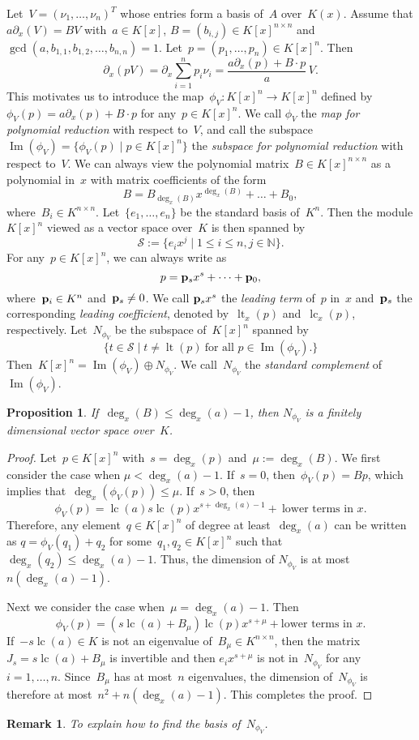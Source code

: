 \documentclass{sig-alternate}
\newtheorem{prop}[theorem]{Proposition}
\newtheorem{remark}[theorem]{Remark}
\newcommand{\red}{\color{red}}
\newcommand{\bN}{ {\mathbb N}}
\newcommand{\cS}{ {\mathcal S}}
\newcommand{\vp} {{\bf p}}
\def\lc{\operatorname{lc}}
\def\lt{\operatorname{lt}}
\def\im{\operatorname{Im}}
\begin{document}
Let~$V = (\nu_1, \ldots, \nu_n)^T$ whose entries form a basis of~$A$ over~$K(x)$. Assume that
$a \partial_x(V) = BV$ with~$a\in K[x]$, $B = (b_{i, j})\in K[x]^{n \times n}$
and $\gcd(a, b_{1, 1}, b_{1, 2}, \ldots, b_{n ,n})=1$. Let~$p = (p_1, \ldots, p_n)\in K[x]^n$. Then
\begin{equation} \label{EQ:polyred}
\partial_x (p V)=\partial_x \sum_{i=1}^n p_i \nu_i = \frac{a\partial_x(p) + B\cdot p}{a}\, V.
\end{equation}
This motivates us to introduce the map~$\phi_V: K[x]^n \rightarrow K[x]^n$
defined by~$\phi_V(p) = a \partial_x(p) + B \cdot p$ for any~$p\in K[x]^n$. We call $\phi_V$
the \emph{map for polynomial reduction} with respect to~$V$, and call
the subspace $\im(\phi_V) = \{\phi_V(p) \mid p \in K[x]^n\}$
the \emph{subspace for polynomial reduction} with respect to~$V$.
We can always view the polynomial matrix~$B\in K[x]^{n\times n}$ as a polynomial in~$x$
with matrix coefficients of the form
\[B = B_{\deg_x(B)}x^{\deg_x(B)} + \ldots + B_0, \]
where~$B_i\in K^{n\times n}$.
Let~$\{e_1, \ldots, e_n\}$ be the standard basis of~$K^n$. Then the module $K[x]^n$ viewed as a vector space over~$K$
is then spanned by
\[\cS := \{e_ix^j \mid 1\leq i \leq n, j\in \bN\}.\]
For any~$p \in K[x]^n$, we can always write as
\[p = \vp_sx^s + \cdots + \vp_0,\]
where~$\vp_i\in K^n$ and~$\vp_s \neq 0$. We call $\vp_sx^s$
the \emph{leading term} of~$p$ in~$x$ and~$\vp_s$ the corresponding \emph{leading coefficient},
denoted by~$\lt_x(p)$ and~$\lc_x(p)$, respectively.
Let~$N_{\phi_V}$ be the subspace of~$K[x]^n$ spanned by
\[\{t \in \cS \mid t \neq \lt(p) ~\text{for all~$p\in \im(\phi_V)$}. \}\]
Then~$K[x]^n = \im(\phi_V) \oplus N_{\phi_V}$. We call~$N_{\phi_V}$ the \emph{standard complement} of~$\im(\phi_V)$.
\begin{prop}\label{PROP:finite}
If~$\deg_x(B) \leq \deg_x(a)-1$, then $N_{\phi_V}$ is a finitely dimensional
vector space over~$K$.
\end{prop}
\begin{proof} Let~$p\in K[x]^n$ with~$s=\deg_x(p)$ and~$\mu := \deg_x(B)$.
We first consider the case when $\mu <\deg_x(a)-1$.
If~$s=0$, then~$\phi_V(p) = B p$,
which implies that~$\deg_x(\phi_V(p))\leq \mu$. If~$s>0$, then
\[\phi_V(p)=\lc(a)s\lc(p)x^{s+\deg_x(a)-1} +~ \text{lower terms in~$x$}.\]
Therefore, any element~$q\in K[x]^n$ of degree at least~$\deg_x(a)$ can be written as
$q = \phi_V(q_1) + q_2$ for some~$q_1, q_2\in K[x]^n$ such that~$\deg_x(q_2)\leq \deg_x(a)-1$.
Thus, the dimension of $N_{\phi_V}$ is at most $n (\deg_x(a)-1)$.

Next we consider the case when~$\mu =\deg_x(a)-1$. Then
\[\phi_V(p) = (s\lc(a) + B_{\mu})\lc(p)x^{s+\mu}+\text{lower terms in~$x$}.\]
If~$-s\lc(a)\in K$ is not an eigenvalue of~$B_{\mu}\in K^{n\times n}$, then
the matrix~$J_s = s\lc(a) + B_{\mu}$ is invertible and then $e_ix^{s+\mu}$ is not in~$N_{\phi_V}$
for any~$i=1, \ldots, n$. Since~$B_\mu$ has at most~$n$ eigenvalues, the dimension of~$N_{\phi_V}$
is therefore at most~$n^2+n(\deg_x(a)-1)$. This completes the proof.
\end{proof}
\begin{remark}
{\red To explain how to find the basis of~$N_{{\phi_V}}$.}
\end{remark}
\end{document}
